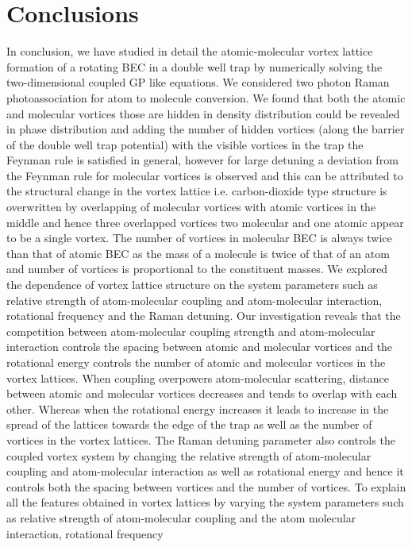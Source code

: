 \documentclass[10pt,a4paper]{article}
\begin{document}
\section{Conclusions}
In conclusion, we have studied in detail the atomic-molecular
vortex lattice formation of a rotating BEC in a double well trap
by numerically solving the two-dimensional coupled GP like
equations. We considered two photon Raman photoassociation for
atom to molecule conversion. We found that both the atomic and
molecular vortices those are hidden in density distribution could
be revealed in phase distribution and adding the number of hidden
vortices (along the barrier of the double well trap potential)
with the visible vortices in the trap the Feynman rule is
satisfied in general, however for large detuning a deviation from
the Feynman rule for molecular vortices is observed and this can
be attributed to the structural change in the vortex lattice i.e.
carbon-dioxide type structure is overwritten by overlapping of molecular 
vortices with atomic vortices in the middle and hence three overlapped 
vortices two molecular and one atomic appear to be a single vortex. 
The number of vortices in
molecular BEC is always twice than that of atomic BEC as the mass
of a molecule is twice of that of an atom and number of vortices
is proportional to the constituent masses. We explored the
dependence of vortex lattice structure on the system parameters
such as relative strength of atom-molecular coupling and
atom-molecular interaction, rotational frequency and the Raman
detuning. Our investigation reveals that the competition between
atom-molecular coupling strength and atom-molecular interaction
controls the spacing between atomic and molecular vortices and the
rotational energy controls the number of atomic and molecular
vortices in the vortex lattices. When coupling overpowers
atom-molecular scattering, distance between atomic and molecular
vortices decreases and tends to overlap with each other. Whereas
when the rotational energy increases it leads to increase in the
spread of the lattices towards the edge of the trap as well as the
number of vortices in the vortex lattices. The Raman detuning
parameter also controls the coupled vortex system by changing the
relative strength of atom-molecular coupling and atom-molecular
interaction as well as rotational energy and hence it controls
both the spacing between vortices and the number of vortices. To
explain all the features obtained in vortex lattices by varying
the system parameters such as relative strength of atom-molecular
coupling and the atom molecular interaction, rotational frequency
\end{document}
